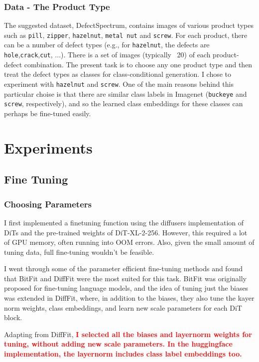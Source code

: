\documentclass[]{article}
\begin{document}
\subsubsection{Data - The Product Type}
The suggested dataset, DefectSpectrum, contains images of various product types such as \texttt{pill}, \texttt{zipper}, \texttt{hazelnut}, \texttt{metal nut} and \texttt{screw}. For each product, there can be a number of defect types (e.g., for \texttt{hazelnut}, the defects are \texttt{hole},\texttt{crack},\texttt{cut}, $\ldots$). There is a set of images (typically ~20) of each product-defect combination. The present task is to choose any one product type and then treat the defect types as classes for class-conditional generation. I chose to experiment with \texttt{hazelnut} and \texttt{screw}. One of the main reasons behind this particular choise is that there are similar class labels in Imagenet (\texttt{buckeye} and \texttt{screw}, respectively), and so the learned class embeddings for these classes can perhaps be fine-tuned easily. 
\section{Experiments}
\subsection{Fine Tuning}
\subsubsection{Choosing Parameters}
I first implemented a finetuning function using the diffusers implementation of DiTs and the pre-trained weights of DiT-XL-2-256. However, this required a lot of GPU memory, often running into OOM errors. Also, given the small amount of tuning data, full fine-tuning wouldn't be feasible. 

I went through some of the parameter efficient fine-tuning methods and found that BitFit and DiffFit were the most suited for this task. BitFit was originally proposed for fine-tuning language models, and the idea of tuning just the biases was extended in DiffFit, where, in addition to the biases, they also tune the kayer norm weights, class embeddings, and learn new scale parameters for each DiT block.  

Adapting from DiffFit, \textbf{\textcolor{red}{I selected all the biases and layernorm weights for tuning, without adding new scale parameters. In the huggingface implementation, the layernorm includes class label embeddings too.}}
\end{document}

